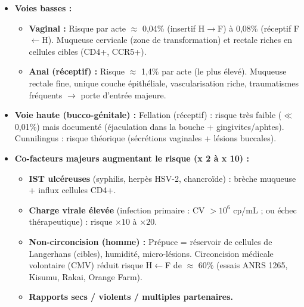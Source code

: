\documentclass[11pt]{article}
\newcommand{\cle}[1]{{\popxbold\color{popdark}#1}}
\begin{document}
\begin{itemize}
    \item \textbf{Voies basses :}
    \begin{itemize}
        \item \textbf{Vaginal :} Risque par acte $\approx$ 0,04\% (insertif H$\to$F) à 0,08\% (réceptif F$\leftarrow$H). Muqueuse cervicale (zone de transformation) et rectale riches en cellules cibles (\cle{CD4+}, \cle{CCR5+}).
        \item \textbf{Anal (réceptif) :} Risque $\approx$ 1,4\% par acte (le plus élevé). Muqueuse rectale fine, unique couche épithéliale, vascularisation riche, traumatismes fréquents $\to$ porte d'entrée majeure.
    \end{itemize}
    \item \textbf{Voie haute (bucco-génitale) :} Fellation (réceptif) : risque très faible ($\ll$ 0,01\%) mais documenté (éjaculation dans la bouche + gingivites/aphtes). Cunnilingus : risque théorique (sécrétions vaginales + lésions buccales).
    \item \textbf{Co-facteurs majeurs augmentant le risque (x 2 à x 10) :}
    \begin{itemize}
        \item \textbf{IST ulcéreuses} (syphilis, herpès HSV-2, chancroïde) : brèche muqueuse + influx cellules \cle{CD4+}.
        \item \textbf{Charge virale élevée} (infection primaire : CV $> 10^6$ cp/mL ; ou échec thérapeutique) : risque $\times 10$ à $\times 20$.
        \item \textbf{Non-circoncision (homme) :} Prépuce = réservoir de cellules de Langerhans (cibles), humidité, micro-lésions. Circoncision médicale volontaire (CMV) réduit risque H$\leftarrow$F de $\approx$ 60\% (essais ANRS 1265, Kisumu, Rakai, Orange Farm).
        \item \textbf{Rapports secs / violents / multiples partenaires.}
    \end{itemize}
\end{itemize}
\end{document}
